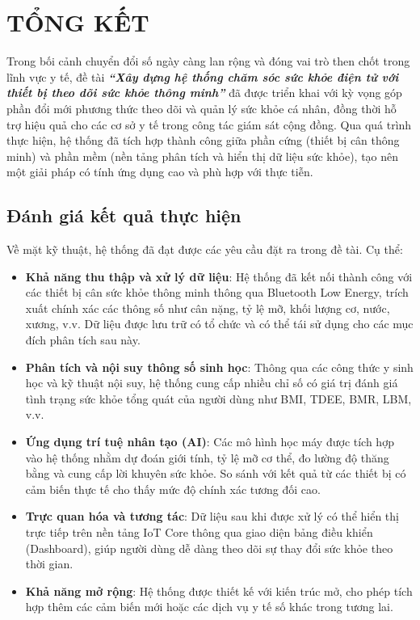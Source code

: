 \section{TỔNG KẾT}

Trong bối cảnh chuyển đổi số ngày càng lan rộng và đóng vai trò then chốt trong lĩnh vực y tế, đề tài \textbf{\textit{“Xây dựng hệ thống chăm sóc sức khỏe điện tử với thiết bị theo dõi sức khỏe thông minh”}} đã được triển khai với kỳ vọng góp phần đổi mới phương thức theo dõi và quản lý sức khỏe cá nhân, đồng thời hỗ trợ hiệu quả cho các cơ sở y tế trong công tác giám sát cộng đồng. Qua quá trình thực hiện, hệ thống đã tích hợp thành công giữa phần cứng (thiết bị cân thông minh) và phần mềm (nền tảng phân tích và hiển thị dữ liệu sức khỏe), tạo nên một giải pháp có tính ứng dụng cao và phù hợp với thực tiễn.

\subsection{Đánh giá kết quả thực hiện}

Về mặt kỹ thuật, hệ thống đã đạt được các yêu cầu đặt ra trong đề tài. Cụ thể:

\begin{itemize}
  \item \textbf{Khả năng thu thập và xử lý dữ liệu}: Hệ thống đã kết nối thành công với các thiết bị cân sức khỏe thông minh thông qua Bluetooth Low Energy, trích xuất chính xác các thông số như cân nặng, tỷ lệ mỡ, khối lượng cơ, nước, xương, v.v. Dữ liệu được lưu trữ có tổ chức và có thể tái sử dụng cho các mục đích phân tích sau này.
  
  \item \textbf{Phân tích và nội suy thông số sinh học}: Thông qua các công thức y sinh học và kỹ thuật nội suy, hệ thống cung cấp nhiều chỉ số có giá trị đánh giá tình trạng sức khỏe tổng quát của người dùng như BMI, TDEE, BMR, LBM, v.v.
  
  \item \textbf{Ứng dụng trí tuệ nhân tạo (AI)}: Các mô hình học máy được tích hợp vào hệ thống nhằm dự đoán giới tính, tỷ lệ mỡ cơ thể, đo lường độ thăng bằng và cung cấp lời khuyên sức khỏe. So sánh với kết quả từ các thiết bị có cảm biến thực tế cho thấy mức độ chính xác tương đối cao.
  
  \item \textbf{Trực quan hóa và tương tác}: Dữ liệu sau khi được xử lý có thể hiển thị trực tiếp trên nền tảng IoT Core thông qua giao diện bảng điều khiển (Dashboard), giúp người dùng dễ dàng theo dõi sự thay đổi sức khỏe theo thời gian.
  
  \item \textbf{Khả năng mở rộng}: Hệ thống được thiết kế với kiến trúc mở, cho phép tích hợp thêm các cảm biến mới hoặc các dịch vụ y tế số khác trong tương lai.
\end{itemize}

